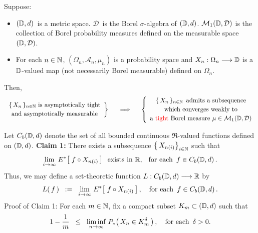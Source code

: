 \begin{theorem}
\mbox{}\vskip 0.1cm
\noindent
Suppose:
\begin{itemize}
\item
	$(\mathbb{D},d)$\, is a metric space.
	$\mathcal{D}$\, is the Borel $\sigma$-algebra of $(\mathbb{D},d)$.
	\vskip 0.0cm
	$\mathcal{M}_{1}(\mathbb{D},\mathcal{D})$ is the collection of Borel probability measures
	defined on the measurable space $(\mathbb{D},\mathcal{D})$.
\item
	For each $n \in \mathbb{N}$,
	$(\Omega_{n},\mathcal{A}_{n},\mu_{n})$ is a probability space and
	$X_{n} : \Omega_{n} \longrightarrow \mathbb{D}$
	is a $\mathbb{D}$-valued map (not necessarily Borel measurable) defined on $\Omega_{n}$.
\end{itemize}
Then,
\begin{equation*}
	\left.\begin{array}{c}
	\textnormal{$\{\,X_{n}\,\}_{n\in\N}$ is asymptotically tight}
	\\
	\overset{{\color{white}.}}{\textnormal{and asymptotically measurable}}
	\end{array}\right\}
\quad\;\;\Longrightarrow\quad\;\,
	\left\{\begin{array}{c}
	\textnormal{$\{\,X_{n}\,\}_{n\in\N}$\, admits a subsequence}
	\\
	\textnormal{$\overset{{\color{white}.}}{\textnormal{which}}$ converges weakly to}
	\\
	\textnormal{a {\color{red}tight} $\overset{{\color{white}.}}{\textnormal{Borel}}$
		measure $\mu\in\mathcal{M}_{1}(\D,\mathcal{D})$}
	\end{array}\right.
\end{equation*}
\end{theorem}
\proof
Let $C_{b}(\mathbb{D},d)$ denote the set of all bounded continuous $\Re$-valued
functions defined on $(\mathbb{D},d)$.
\vskip 0.3cm
\noindent
\textbf{Claim 1:}\;\;
There exists a subsequence $\left\{\,X_{n(i)}\right\}_{i\in\mathbb{N}}$ such that
\begin{equation*}
\underset{i\rightarrow\infty}{\lim}\; E^{*}\!\left[\; f \circ X_{n(i)} \,\right]
\;\;\textnormal{exists in $\mathbb{R}$, \; for each \,$f \in C_{b}(\mathbb{D},d)$}\,.
\end{equation*}
Thus, we may define a set-theoretic function $L : C_{b}(\mathbb{D},d) \longrightarrow \mathbb{R}$ by
\begin{equation*}
L(\,f\,)
\;\; := \;\;
	\underset{i\rightarrow\infty}{\lim}\; E^{*}\!\left[\; f \circ X_{n(i)} \,\right],
\quad
\textnormal{for each \,$f \in C_{b}(\mathbb{D},d)$}\,.
\end{equation*}
Proof of Claim 1:\;\;
For each $m \in \mathbb{N}$, fix a compact subset $K_{m} \subset (\mathbb{D},d)$ such that
\begin{equation*}
1 - \dfrac{1}{m}
\;\; \leq \;\;
	\underset{n\rightarrow\infty}{\liminf}\;
	P_{*}\!\left(\,X_{n} \in K_{m}^{\delta}\,\right),
\quad
\textnormal{for each \,$\delta > 0$}.
\end{equation*}


